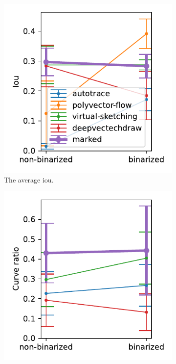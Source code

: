 \begin{figure}[h]
    \centering
    \begin{subfigure}{.3\textwidth}
    \centering
    \includegraphics[width=\textwidth]{graphics/eval/iou_binarization_tonari.pdf}
    \caption{The average \gls{iou}.}
\end{subfigure}
    \begin{subfigure}{.3\textwidth}
    \centering
    \includegraphics[width=\textwidth]{graphics/eval/curve ratio_binarization_tonari.pdf}

\end{subfigure}
\end{figure}

